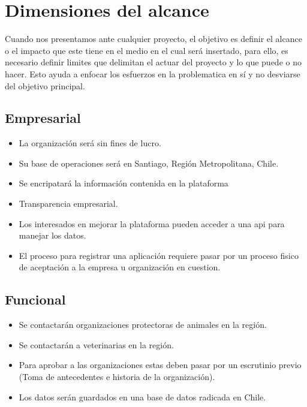 \documentclass[letterpaper,openright,10pt,oneside]{report}
\begin{document}
		\section{Dimensiones del alcance}
		Cuando nos presentamos ante cualquier proyecto, el objetivo es definir el alcance o el impacto que este tiene en el medio en el cual será insertado, para ello, es necesario definir limites que delimitan el actuar del proyecto y lo que puede o no hacer. Esto ayuda a enfocar los esfuerzos en la problematica en sí y no desviarse del objetivo principal.
			\subsection{Empresarial}
				\begin{itemize}
					\item La organización será sin fines de lucro.
					\item Su base de operaciones será en Santiago, Región Metropolitana, Chile.
					\item Se encripatará la información contenida en la plataforma
					\item Transparencia empresarial.	
					\item Los interesados en mejorar la plataforma pueden acceder a una api para manejar los datos.
					\item El proceso para registrar una aplicación requiere pasar por un proceso fisico de aceptación a la empresa u organización en cuestion.		
				\end{itemize}
			\subsection{Funcional}
				\begin{itemize}
					\item Se contactarán organizaciones protectoras de animales en la región.
					\item Se contactarán a veterinarias en la región.
					\item Para aprobar a las organizaciones estas deben pasar por un escrutinio previo (Toma de antecedentes e historia de la organización).
					\item Los datos serán guardados en una base de datos radicada en Chile.
				\end{itemize}
\end{document}
